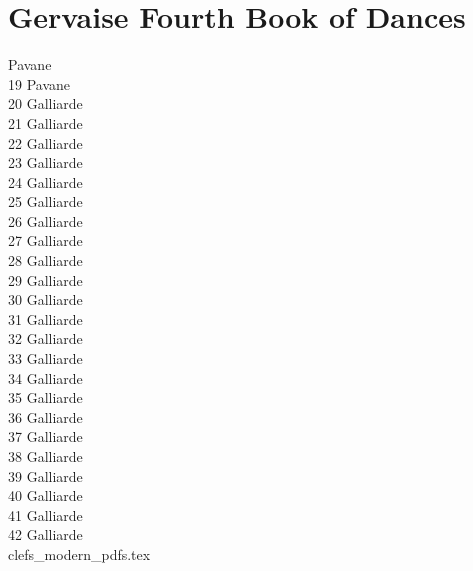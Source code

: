 \documentclass[11pt]{book}
\begin{document}

\pagestyle{fancy}

\fancyhf{}

\fancyhead[LE,RO]{\thepage}
\renewcommand{\headrulewidth}{0pt}
\renewcommand{\footrulewidth}{0pt}
\setlength{\parindent}{0pt}
\setlength{\parskip}{11pt plus 2pt minus 4pt}

\mainmatter
\section*{Gervaise Fourth Book of Dances}
 Pavane \dotfill \pageref{01_pavane} \\
19 Pavane \dotfill \pageref{19_pavane} \\
20 Galliarde \dotfill \pageref{20_galliarde} \\
21 Galliarde\dotfill \pageref{21_galliarde} \\
22 Galliarde\dotfill \pageref{22_galliarde} \\
23 Galliarde\dotfill \pageref{23_galliarde} \\
24 Galliarde\dotfill \pageref{24_galliarde} \\
25 Galliarde\dotfill \pageref{25_galliarde} \\
26 Galliarde\dotfill \pageref{26_galliarde} \\
27 Galliarde\dotfill \pageref{27_galliarde} \\
28 Galliarde\dotfill \pageref{28_galliarde} \\
29 Galliarde\dotfill \pageref{29_galliarde} \\
30 Galliarde\dotfill \pageref{30_galliarde} \\
31 Galliarde\dotfill \pageref{31_galliarde} \\
32 Galliarde\dotfill \pageref{32_galliarde} \\
33 Galliarde\dotfill \pageref{33_galliarde} \\
34 Galliarde\dotfill \pageref{34_galliarde} \\
35 Galliarde\dotfill \pageref{35_galliarde} \\
36 Galliarde\dotfill \pageref{36_galliarde} \\
37 Galliarde\dotfill \pageref{37_galliarde} \\
38 Galliarde\dotfill \pageref{38_galliarde} \\
39 Galliarde\dotfill \pageref{39_galliarde} \\
40 Galliarde\dotfill \pageref{40_galliarde} \\
41 Galliarde\dotfill \pageref{41_galliarde} \\
42 Galliarde\dotfill \pageref{42_galliarde} \\
%
%
\clearpage
 {clefs_modern_pdfs.tex}
\end{document}
